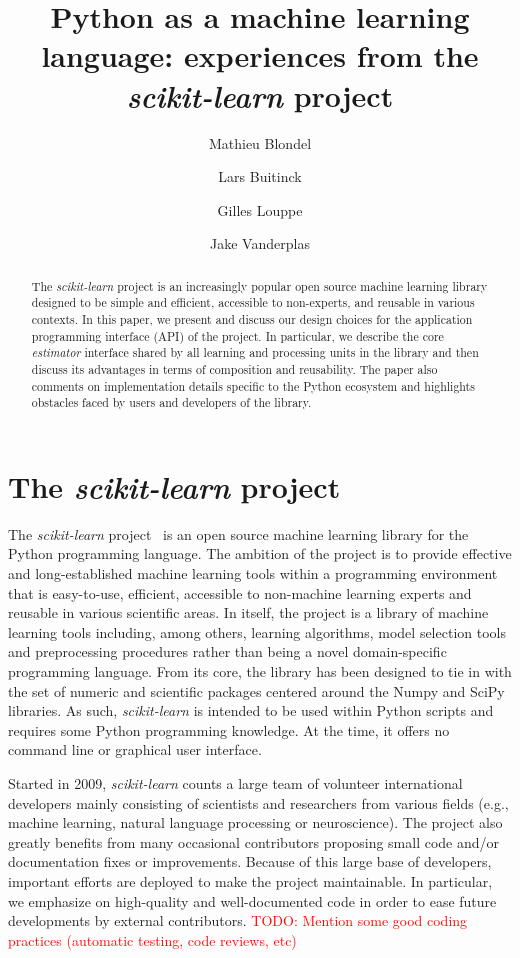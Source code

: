 \documentclass{llncs}
\title{Python as a machine learning language:
       experiences from the \textit{scikit-learn} project}
\author{Mathieu Blondel\inst{1} \and
        Lars Buitinck\inst{2} \and
        Gilles Louppe\inst{3} \and
        Jake Vanderplas\inst{4}}
\institute{Graduate School of System Informatics, Kobe University \and
           Informatics Institute, University of Amsterdam \and
           Department of EE \& CS, University of Liège \and
           Astronomy Department, University of Washington}
\begin{document}
\maketitle

\begin{abstract}
The \textit{scikit-learn} project is an increasingly popular open source machine
learning library designed to be simple and efficient, accessible to non-experts,
and reusable in various contexts. In this paper, we present and discuss our
design choices for the application programming interface (API) of the project.
In particular, we describe the core \textit{estimator} interface shared by all
learning and processing units in the library and then discuss its advantages in
terms of composition and reusability. The paper also comments on implementation
details specific to the Python ecosystem and highlights obstacles faced by users
and developers of the library.
\end{abstract}

\section{The \textit{scikit-learn} project}

The \textit{scikit-learn} project~\citep{pedregosa2011} is an open source
machine learning library for the Python programming language. The ambition of
the project is to provide  effective and long-established machine learning tools
within a programming environment that is easy-to-use, efficient, accessible to
non-machine learning experts and reusable in various scientific areas. In
itself, the project is a library of machine learning tools including, among
others, learning algorithms, model selection tools and preprocessing procedures
rather than being a novel domain-specific programming language. From its core,
the library has been designed to tie in with the set of numeric and scientific
packages centered around the Numpy and SciPy~\citep{vanderwalt2011,
varoquaux2013scipy} libraries. As such, \textit {scikit-learn} is intended to be
used within Python scripts and requires some Python programming knowledge. At
the time, it offers no command line or graphical user interface.

Started in 2009, \textit{scikit-learn} counts a large team of volunteer
international developers mainly consisting of scientists and researchers from
various fields (e.g., machine learning, natural language processing or
neuroscience). The project also greatly benefits from many occasional
contributors proposing small code and/or documentation fixes or improvements.
Because of this large base of developers, important efforts are deployed to make
the project maintainable. In particular, we emphasize on high-quality and well-documented
code  in order to ease future developments by external contributors.
\textcolor{red}{TODO: Mention some good coding practices (automatic testing, code
reviews, etc)}
\end{document}
